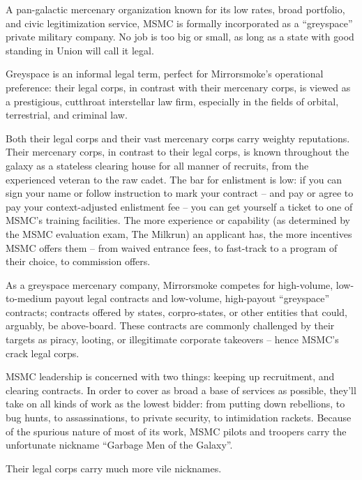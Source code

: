 A pan-galactic mercenary organization known for its low rates, broad portfolio, and civic  
legitimization service, MSMC is formally incorporated as a “greyspace” private military company.  
No job is too big or small, as long as a state with good standing in Union will call it legal.  

                                                                                                          


Greyspace is an informal legal term, perfect for Mirrorsmoke’s operational preference: their legal  
corps, in contrast with their mercenary corps, is viewed as a prestigious, cutthroat interstellar law  
firm, especially in the fields of orbital, terrestrial, and criminal  law.  
 

Both their legal corps and their vast mercenary corps carry weighty reputations. Their mercenary  
corps, in contrast to their legal corps, is known throughout the galaxy as a stateless clearing  
house for all manner of recruits, from the experienced veteran to the raw cadet. The bar for  
enlistment is low: if you can sign your name or follow instruction to mark your contract -- and  
pay or agree to pay your context-adjusted enlistment fee -- you can get yourself a ticket to one  
of MSMC’s training facilities. The more experience or capability (as determined by the MSMC  
evaluation exam, The Milkrun) an applicant has, the more incentives MSMC offers them -- from  
waived entrance fees, to fast-track to a program of their choice, to commission offers. 
 

As a greyspace mercenary company, Mirrorsmoke competes for high-volume, low-to-medium  
payout legal contracts and low-volume, high-payout “greyspace” contracts; contracts offered by  
states, corpro-states, or other entities that could, arguably, be above-board. These contracts are  
commonly challenged by their targets as piracy, looting, or illegitimate corporate takeovers --  
hence MSMC’s crack legal corps.   
 

MSMC leadership is concerned with two things: keeping up recruitment, and clearing contracts.  
In order to cover as broad a base of services as possible, they’ll take on all kinds of work as the  
lowest bidder: from putting down rebellions, to bug hunts, to assassinations, to private security,  
to intimidation rackets. Because of the spurious nature of most of its work, MSMC pilots and  
troopers carry the unfortunate nickname “Garbage Men of the Galaxy”. 
 

Their legal corps carry much more vile nicknames. 
 

